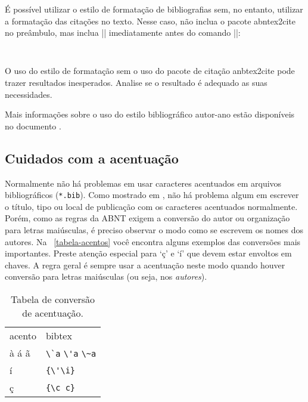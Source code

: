 \documentclass[a4paper]{ltxdoc}
\begin{document}
É possível utilizar o estilo de formatação de bibliografias sem, no entanto,
utilizar a formatação das citações no texto. Nesse caso, não inclua o pacote
\textsf{abntex2cite} no preâmbulo, mas inclua ||
imediatamente antes do comando
||:

\begin{verbatim}


\end{verbatim}

O uso do estilo de formatação sem o uso do pacote de citação
\textsf{anbtex2cite} pode trazer resultados inesperados. Analise se o resultado
é adequado as suas necessidades.

Mais informações sobre o uso do estilo bibliográfico autor-ano estão disponíveis
no documento .

\subsection{Cuidados com a acentuação}

Normalmente não há problemas em usar caracteres acentuados em arquivos
bibliográficos (\texttt{*.bib}). Como mostrado em \cite{brasil1988}, não há problema algum em escrever o título, tipo ou local de publicação com os caracteres acentuados normalmente. Porém, como as regras da ABNT exigem a conversão do autor ou organização para letras maiúsculas, é preciso observar o modo como se
escrevem os nomes dos autores. Na ~\autoref{tabela-acentos} você encontra alguns
exemplos das conversões mais importantes. Preste atenção especial para `ç' e `í'
que devem estar envoltos em chaves. A regra geral é sempre usar a acentuação
neste modo quando houver conversão para letras maiúsculas (ou seja, nos \textit{autores}). 

\begin{table}[htbp]
\caption{Tabela de conversão de acentuação.}
\label{tabela-acentos}
\begin{center}
\begin{tabular}{ll}
&\\
\toprule
acento & \textsf{bibtex}\\
\midrule
à á ã & \verb+\`a+ \verb+\'a+ \verb+\~a+\\
í & \verb+{\'\i}+\\
ç & \verb+{\c c}+\\
\bottomrule
\end{tabular}
\end{center}
\end{table}
\end{document}
